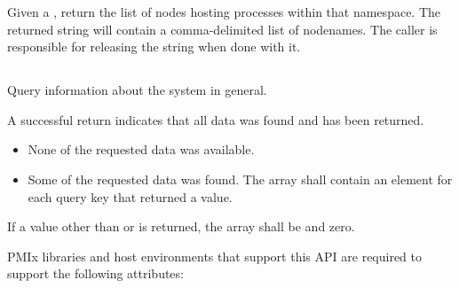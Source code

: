 \returnsimple

\descr

Given a , return the list of nodes hosting processes within that namespace.
The returned string will contain a comma-delimited list of nodenames.
The caller is responsible for releasing the string when done with it.


\subsection{}

\summary

Query information about the system in general.

\format


\begin{arglist}
\end{arglist}

A successful return indicates that all data was found and has been returned.

\returnstart
\begin{itemize}
\item {} None of the requested data was available.
\item {} Some of the requested data was found.
The  array shall contain an element for each query key that returned a value.
\end{itemize}
\returnend

If a value other than  or  is returned, the
 array shall be  and  zero.

\reqattrstart
\ac{PMIx} libraries and host environments that support this \ac{API} are required to support the following attributes:

